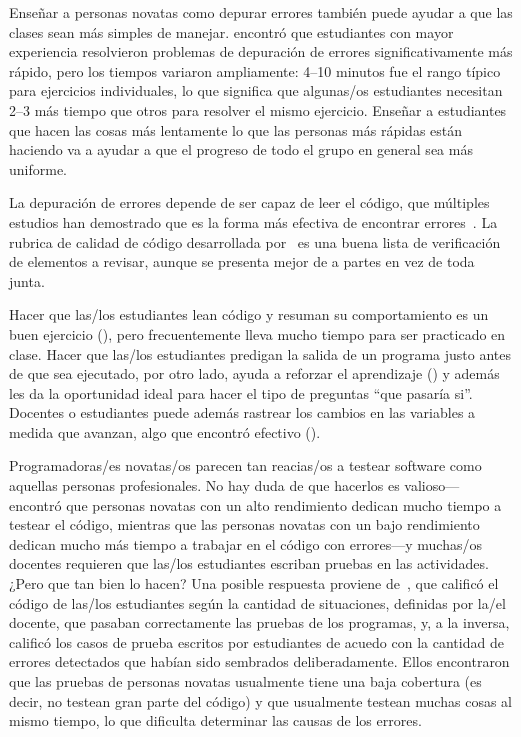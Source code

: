 Enseñar a personas novatas como depurar errores también puede ayudar a que las clases sean más simples de manejar.
\cite{Alqa2017} encontró que estudiantes con mayor experiencia resolvieron problemas de depuración de errores significativamente más rápido,
pero los tiempos variaron ampliamente:
4--10 minutos fue el rango típico para ejercicios individuales,
lo que significa que algunas/os estudiantes necesitan 2--3 más tiempo que otros para resolver el mismo ejercicio.
Enseñar a estudiantes que hacen las cosas más lentamente lo que las personas más rápidas están haciendo
va a ayudar a que el progreso de todo el grupo en general sea más uniforme.

La depuración de errores depende de ser capaz de leer el código,
que múltiples estudios han demostrado que es la forma más efectiva de encontrar errores~\cite{Basi1987,Keme2009,Bacc2013}.
La rubrica de calidad de código desarrollada por~\cite{Steg2014,Steg2016a}
es una buena lista de verificación de elementos a revisar,
aunque se presenta mejor de a partes en vez de toda junta.

Hacer que las/los estudiantes lean código y resuman su comportamiento es un buen ejercicio (),
pero frecuentemente lleva mucho tiempo para ser practicado en clase.
Hacer que las/los estudiantes predigan la salida de un programa justo antes de que sea ejecutado,
por otro lado,
ayuda a reforzar el aprendizaje ()
y además les da la oportunidad ideal para hacer el tipo de preguntas ``que pasaría si''.
Docentes o estudiantes puede además rastrear los cambios en las variables a medida que avanzan,
algo que \cite{Cunn2017} encontró efectivo ().


Programadoras/es novatas/os parecen tan reacias/os a testear software como aquellas personas profesionales.
No hay duda de que hacerlos es valioso---\cite{Cart2017} encontró que
personas novatas con un alto rendimiento dedican mucho tiempo a testear el código,
mientras que las personas novatas con un bajo rendimiento dedican mucho más tiempo a trabajar en el código con errores---y muchas/os docentes
requieren que las/los estudiantes escriban pruebas en las actividades.
¿Pero que tan bien lo hacen?
Una posible respuesta proviene de~\cite{Bria2015},
que calificó el código de las/los estudiantes según la cantidad de situaciones, definidas por la/el docente, que pasaban correctamente las pruebas de los programas,
y, a la inversa, calificó los casos de prueba escritos por estudiantes de acuedo con la cantidad de errores detectados que habían sido sembrados deliberadamente.
Ellos encontraron que las pruebas de personas novatas usualmente tiene una baja cobertura (es decir, no testean gran parte del código)
y que usualmente testean muchas cosas al mismo tiempo, lo que dificulta determinar las causas de los errores.

